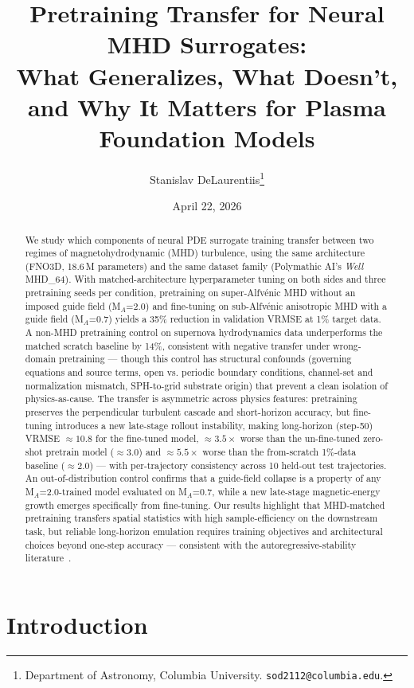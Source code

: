 \documentclass{article}
\title{Pretraining Transfer for Neural MHD Surrogates:\\
What Generalizes, What Doesn't, and Why It Matters for Plasma Foundation Models}
\author{%
  Stanislav DeLaurentiis\thanks{Department of Astronomy, Columbia University. \texttt{sod2112@columbia.edu}.} \\
}
\date{April 22, 2026}
\begin{document}
\maketitle

\begin{abstract}
We study which components of neural PDE surrogate training transfer between two regimes of magnetohydrodynamic (MHD) turbulence, using the same architecture (FNO3D, 18.6\,M parameters) and the same dataset family (Polymathic AI's \emph{Well} MHD\_64). With matched-architecture hyperparameter tuning on both sides and three pretraining seeds per condition, pretraining on super-Alfv\'enic MHD without an imposed guide field (M$_A$=2.0) and fine-tuning on sub-Alfv\'enic anisotropic MHD with a guide field (M$_A$=0.7) yields a 35\% reduction in validation VRMSE at 1\% target data. A non-MHD pretraining control on supernova hydrodynamics data underperforms the matched scratch baseline by 14\%, consistent with negative transfer under wrong-domain pretraining --- though this control has structural confounds (governing equations and source terms, open vs. periodic boundary conditions, channel-set and normalization mismatch, SPH-to-grid substrate origin) that prevent a clean isolation of physics-as-cause. The transfer is asymmetric across physics features: pretraining preserves the perpendicular turbulent cascade and short-horizon accuracy, but fine-tuning introduces a new late-stage rollout instability, making long-horizon (step-50) VRMSE $\approx 10.8$ for the fine-tuned model, $\approx 3.5\times$ worse than the un-fine-tuned zero-shot pretrain model ($\approx 3.0$) and $\approx 5.5\times$ worse than the from-scratch 1\%-data baseline ($\approx 2.0$) --- with per-trajectory consistency across 10 held-out test trajectories. An out-of-distribution control confirms that a guide-field collapse is a property of any M$_A$=2.0-trained model evaluated on M$_A$=0.7, while a new late-stage magnetic-energy growth emerges specifically from fine-tuning. Our results highlight that MHD-matched pretraining transfers spatial statistics with high sample-efficiency on the downstream task, but reliable long-horizon emulation requires training objectives and architectural choices beyond one-step accuracy --- consistent with the autoregressive-stability literature~\cite{mccabe2023stability,lippe2023pderefiner}.
\end{abstract}

\section{Introduction}
\end{document}
